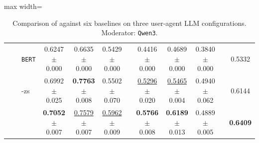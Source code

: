 \begin{table}[ht]
\begin{adjustbox}{max width=\textwidth}
\begin{tabular}{@{}l l l ccc p{0.15cm} ccc p{0.15cm} c@{}}
        & & \cellcolor{white} \texttt{BERT}                   & \cellcolor{white} 0.6247 {\tiny$\pm$ 0.000} & \cellcolor{white} 0.6635 {\tiny$\pm$ 0.000} & \cellcolor{white} 0.5429 {\tiny$\pm$ 0.000}  & & \cellcolor{white} 0.4416 {\tiny$\pm$ 0.000} & \cellcolor{white} 0.4689 {\tiny$\pm$ 0.000} & \cellcolor{white} 0.3840 {\tiny$\pm$ 0.000}  & & \cellcolor{avgall!85}0.5332 \\
        & & \cellcolor{methodrow} \method{}-zs          & \cellcolor{methodrow} 0.6992 {\tiny$\pm$ 0.025} & \cellcolor{methodrow} \textbf{0.7763} {\tiny$\pm$ 0.008} & \cellcolor{methodrow} 0.5502 {\tiny$\pm$ 0.070}  & & \cellcolor{methodrow} \underline{0.5296} {\tiny$\pm$ 0.020} & \cellcolor{methodrow} \underline{0.5465} {\tiny$\pm$ 0.004} & \cellcolor{methodrow} 0.4940 {\tiny$\pm$ 0.062}  & & \cellcolor{avgall!85}0.6144 \\
        & & \cellcolor{methodrow} \method{}                    & \cellcolor{methodrow} \textbf{0.7052} {\tiny$\pm$ 0.007} & \cellcolor{methodrow} \underline{0.7579} {\tiny$\pm$ 0.007} & \cellcolor{methodrow} \underline{0.5962} {\tiny$\pm$ 0.009}  & & \cellcolor{methodrow} \textbf{0.5766} {\tiny$\pm$ 0.008} & \cellcolor{methodrow} \textbf{0.6189} {\tiny$\pm$ 0.013} & \cellcolor{methodrow} 0.4889 {\tiny$\pm$ 0.005}  & & \cellcolor{avgall!85}\textbf{0.6409} \\
        \bottomrule
    \end{tabular}
    \end{adjustbox}
    \caption{\small Comparison of \method{} against six baselines on three user-agent LLM configurations. Moderator: \texttt{Qwen3}.}
    \label{tab:triple_dataset_comparison}
\end{table}
